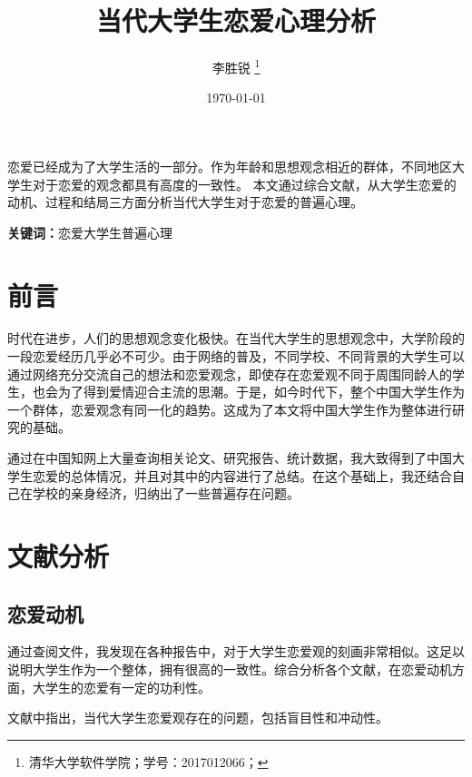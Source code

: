 \documentclass[UTF8,a4paper]{ctexart}
\title{\bfseries 当代大学生恋爱心理分析}
\author{李胜锐 \thanks{清华大学软件学院；学号：2017012066；}}
\date{\today}
\begin{document}
% 
% 

\maketitle


\begin{center}
\parbox{130mm}{
恋爱已经成为了大学生活的一部分。作为年龄和思想观念相近的群体，不同地区大学生对于恋爱的观念都具有高度的一致性。
本文通过综合文献，从大学生恋爱的动机、过程和结局三方面分析当代大学生对于恋爱的普遍心理。
\par
\vspace{1mm}
{\bfseries 关键词：}恋爱\quad 大学生\quad 普遍\quad 心理}
\end{center}



\section{前言}
时代在进步，人们的思想观念变化极快。在当代大学生的思想观念中，大学阶段的一段恋爱经历几乎必不可少。由于网络的普及，不同学校、不同背景的大学生可以通过网络充分交流自己的想法和恋爱观念，即使存在恋爱观不同于周围同龄人的学生，也会为了得到爱情迎合主流的思潮。于是，如今时代下，整个中国大学生作为一个群体，恋爱观念有同一化的趋势。这成为了本文将中国大学生作为整体进行研究的基础。

通过在中国知网上大量查询相关论文、研究报告、统计数据，我大致得到了中国大学生恋爱的总体情况，并且对其中的内容进行了总结。在这个基础上，我还结合自己在学校的亲身经济，归纳出了一些普遍存在问题。

\section{文献分析}
\subsection{恋爱动机}
通过查阅文件，我发现在各种报告中，对于大学生恋爱观的刻画非常相似。这足以说明大学生作为一个整体，拥有很高的一致性。综合分析各个文献，在恋爱动机方面，大学生的恋爱有一定的功利性。

文献中指出，当代大学生恋爱观存在的问题，包括盲目性和冲动性。
\end{document}
